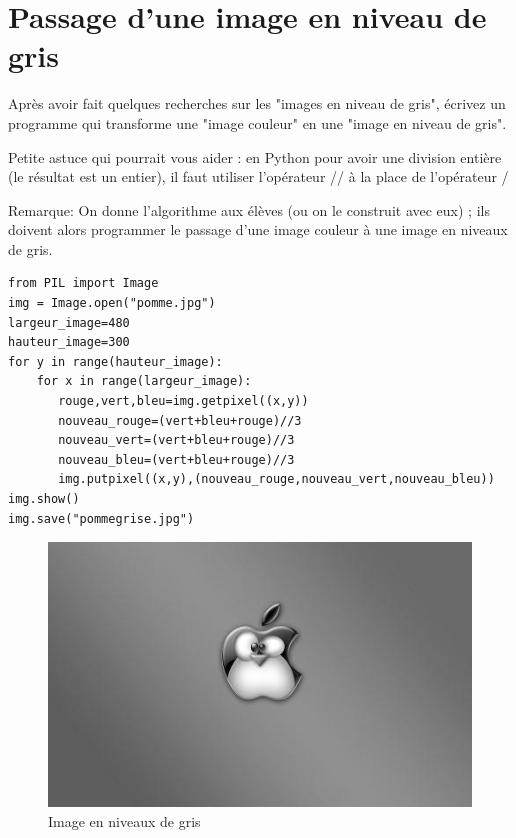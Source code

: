 \documentclass[11pt]{article}
\begin{document}
\section{Passage d'une image en niveau de gris}
\label{sec:orgc452023}

Après avoir fait quelques recherches sur les "images en niveau de gris", écrivez un programme qui transforme une "image couleur" en une "image en niveau de gris".

Petite astuce qui pourrait vous aider : en Python pour avoir une division entière (le résultat est un entier), il faut utiliser l'opérateur // à la place de l'opérateur / 

Remarque: On donne l'algorithme aux élèves (ou on le construit avec eux) ; ils doivent alors programmer le passage d'une image couleur à une image en niveaux de gris.


\begin{verbatim}
from PIL import Image
img = Image.open("pomme.jpg")
largeur_image=480
hauteur_image=300
for y in range(hauteur_image):
    for x in range(largeur_image):
       rouge,vert,bleu=img.getpixel((x,y))
       nouveau_rouge=(vert+bleu+rouge)//3
       nouveau_vert=(vert+bleu+rouge)//3
       nouveau_bleu=(vert+bleu+rouge)//3
       img.putpixel((x,y),(nouveau_rouge,nouveau_vert,nouveau_bleu))
img.show()
img.save("pommegrise.jpg")
\end{verbatim}

\begin{figure}[htbp]
\centering
\includegraphics[width=.9\linewidth]{pommegrise.jpg}
\caption{Image en niveaux de gris}
\end{figure}
\end{document}
